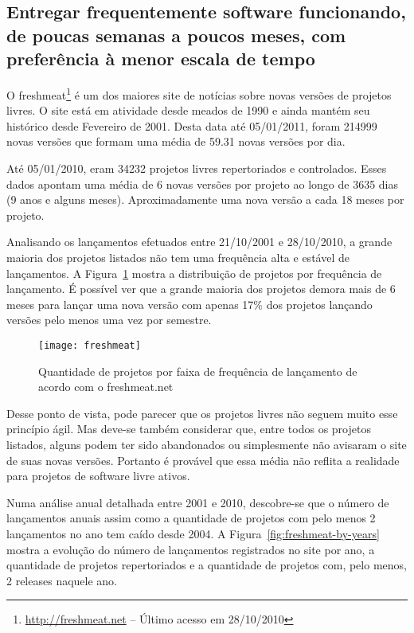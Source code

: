 \subsection[Entregas frequentes]{Entregar frequentemente software
  funcionando, de poucas semanas a poucos meses, com preferência à
  menor escala de tempo}

O freshmeat\footnote{\url{http://freshmeat.net} -- Último acesso em
  28/10/2010} é um dos maiores site de notícias sobre novas versões de
projetos livres. O site está em atividade desde meados de 1990 e ainda
mantém seu histórico desde Fevereiro de 2001. Desta data até
05/01/2011, foram 214999 novas versões que formam uma média de 59.31
novas versões por dia.

Até 05/01/2010, eram 34232 projetos livres repertoriados e
controlados. Esses dados apontam uma média de 6 novas versões por
projeto ao longo de 3635 dias (9 anos e alguns meses).
Aproximadamente uma nova versão a cada 18 meses por projeto.

Analisando os lançamentos efetuados entre 21/10/2001 e 28/10/2010, a
grande maioria dos projetos listados não tem uma frequência alta e
estável de lançamentos. A Figura~\ref{fig:freshmeat} mostra a
distribuição de projetos por frequência de lançamento. É possível ver
que a grande maioria dos projetos demora mais de 6 meses para lançar
uma nova versão com apenas 17\% dos projetos lançando versões pelo
menos uma vez por semestre.


\begin{figure}[htb]
  \centering
  \texttt{[image: freshmeat]}
  \caption{Quantidade de projetos por faixa de frequência de
    lançamento de acordo com o freshmeat.net}
  \label{fig:freshmeat}
\end{figure}

Desse ponto de vista, pode parecer que os projetos livres não seguem
muito esse princípio ágil. Mas deve-se também considerar que, entre
todos os projetos listados, alguns podem ter sido abandonados ou
simplesmente não avisaram o site de suas novas versões. Portanto é
provável que essa média não reflita a realidade para projetos de
software livre ativos.

Numa análise anual detalhada entre 2001 e 2010, descobre-se que o
número de lançamentos anuais assim como a quantidade de projetos com
pelo menos 2 lançamentos no ano tem caído desde 2004. A
Figura~\ref{fig:freshmeat-by-years} mostra a evolução do número de
lançamentos registrados no site por ano, a quantidade de projetos
repertoriados e a quantidade de projetos com, pelo menos, 2 releases
naquele ano.

